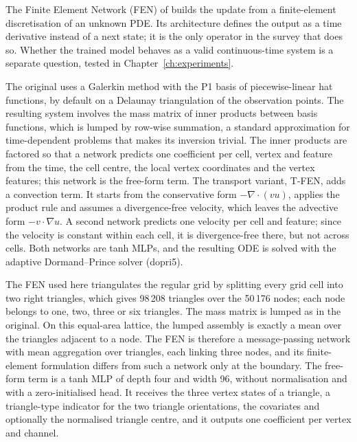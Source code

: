 The Finite Element Network (FEN) of \citet{Lienen2022} builds the
update from a finite-element discretisation of an unknown PDE. Its
architecture defines the output as a time derivative instead of a next
state; it is the only operator in the survey that does so. Whether the
trained model behaves as a valid continuous-time system is a separate
question, tested in Chapter~\ref{ch:experiments}.

The original uses a Galerkin method with the P1 basis of piecewise-linear
hat functions, by default on a Delaunay triangulation of the observation
points. The resulting system involves the mass matrix of inner products
between basis functions, which is lumped by row-wise summation, a
standard approximation for time-dependent problems that makes its inversion
trivial. The inner products are factored so that a network predicts one
coefficient per cell, vertex and feature from the time, the cell centre,
the local vertex coordinates and the vertex features; this network is the
free-form term. The
transport variant, T-FEN, adds a convection term. It starts from the
conservative form $-\nabla \cdot (v u)$, applies the product rule and
assumes a divergence-free velocity, which leaves the advective form
$-v \cdot \nabla u$. A second network predicts one velocity per cell and
feature; since the velocity is constant within each cell, it is
divergence-free there, but not across cells. Both networks are tanh MLPs,
and the resulting ODE is solved with the adaptive Dormand--Prince solver
(dopri5).

The FEN used here triangulates the regular grid by splitting every grid
cell into two right triangles, which gives 98\,208 triangles over the
50\,176 nodes; each node belongs to one, two, three or six triangles. The
mass matrix is lumped as in the original. On this equal-area lattice, the
lumped assembly is exactly a mean over the triangles adjacent to a node.
The FEN is therefore a message-passing network with mean aggregation over
triangles, each linking three nodes, and its finite-element formulation
differs from such a network only at the boundary. The free-form term is a tanh MLP
of depth four and width 96, without normalisation and with a
zero-initialised head. It receives the three vertex states of a triangle, a
triangle-type indicator for the two triangle orientations, the covariates
and optionally the normalised triangle centre, and it outputs one
coefficient per vertex and channel.

